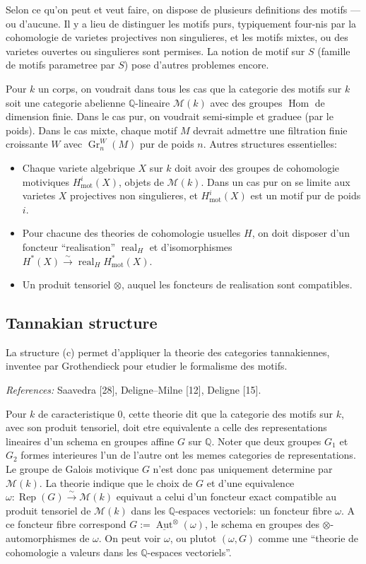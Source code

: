 \documentclass[11pt,a4paper]{article}
\theoremstyle{plain}
\theoremstyle{definition}
\DeclareMathOperator{\Hom}{Hom}
\DeclareMathOperator{\Aut}{Aut}
\DeclareMathOperator{\Rep}{Rep}
\DeclareMathOperator{\Gr}{Gr}
\newcommand{\Q}{\mathbb{Q}}
\DeclareMathOperator{\mot}{mot}
\DeclareMathOperator{\real}{real}
\begin{document}
Selon ce qu'on peut et veut faire, on dispose de plusieurs definitions des
motifs --- ou d'aucune. Il y a lieu de distinguer les motifs purs, typiquement
four-nis par la cohomologie de varietes projectives non singulieres, et les motifs
mixtes, ou des varietes ouvertes ou singulieres sont permises. La notion de
motif sur $S$ (famille de motifs parametree par $S$) pose d'autres problemes encore.

Pour $k$ un corps, on voudrait dans tous les cas que la categorie des motifs sur $k$ soit une categorie abelienne $\Q$-lineaire $\mathcal{M}(k)$ avec des groupes
$\Hom$ de dimension finie. Dans le cas pur, on voudrait semi-simple et
graduee (par le poids). Dans le cas mixte, chaque motif $M$ devrait admettre
une filtration finie croissante $W$ avec $\Gr_n^W(M)$ pur de poids $n$. Autres
structures essentielles:

\begin{itemize}
\item[(a)] Chaque variete algebrique $X$ sur $k$ doit avoir des groupes de cohomologie motiviques $H^i_{\mot}(X)$, objets de $\mathcal{M}(k)$. Dans un cas pur on se limite aux varietes $X$ projectives non singulieres, et $H^i_{\mot}(X)$ est un motif pur de poids $i$.

\item[(b)] Pour chacune des theories de cohomologie usuelles $H$, on doit disposer d'un foncteur ``realisation'' $\real_H$ et d'isomorphismes $H^*(X) \xrightarrow{\sim} \real_H H^*_{\mot}(X)$.

\item[(c)] Un produit tensoriel $\otimes$, auquel les foncteurs de realisation sont compatibles.
\end{itemize}

\subsection{Tannakian structure}

La structure (c) permet d'appliquer la theorie des categories tannakiennes,
inventee par Grothendieck pour etudier le formalisme des motifs.

\textit{References:} Saavedra [28], Deligne--Milne [12], Deligne [15].

Pour $k$ de caracteristique $0$, cette theorie dit que la categorie des motifs sur $k$, avec son produit tensoriel, doit etre equivalente a celle des representations lineaires d'un schema en groupes affine $G$ sur $\Q$. Noter que deux groupes $G_1$ et $G_2$ formes interieures l'un de l'autre ont les memes categories de representations. Le groupe de Galois motivique $G$ n'est donc pas uniquement determine par $\mathcal{M}(k)$. La theorie indique que le choix de $G$ et d'une equivalence $\omega: \Rep(G) \xrightarrow{\sim} \mathcal{M}(k)$ equivaut a celui d'un foncteur exact compatible au produit tensoriel de $\mathcal{M}(k)$ dans les $\Q$-espaces vectoriels: un foncteur fibre $\omega$. A ce foncteur fibre correspond $G := \underline{\Aut}^{\otimes}(\omega)$, le schema en groupes des $\otimes$-automorphismes de $\omega$. On peut voir $\omega$, ou plutot $(\omega, G)$ comme une ``theorie de cohomologie a valeurs dans les $\Q$-espaces vectoriels''.
\end{document}
